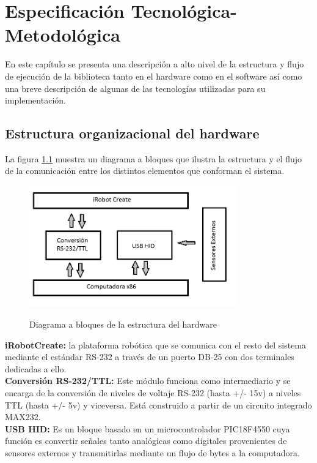 \documentclass[letterpaper,openright,12pt]{book}
\begin{document}
\chapter{Especificación Tecnológica-Metodológica}
En este capítulo se presenta una descripción a alto nivel de la estructura y flujo de ejecución de la biblioteca tanto en el hardware como en el software así como una breve descripción de algunas de las tecnologías utilizadas para su implementación.
\section{Estructura organizacional del hardware}
La figura \ref{fig:bloquesHardware} muestra un diagrama a bloques que ilustra la estructura y el flujo de la comunicación entre los distintos elementos que conforman el sistema.\\
\begin{figure}
\begin{center}
\includegraphics[width=0.8\textwidth]{figures/bloquesHardware.png}
\caption{Diagrama a bloques de la estructura del hardware}
\centering
\label{fig:bloquesHardware}
\end{center}
\end{figure} 
\textbf{iRobotCreate:} la plataforma robótica que se comunica con el resto del sistema mediante el estándar RS-232 a través de un puerto DB-25 con dos terminales dedicadas a ello.\\
\textbf{Conversión RS-232/TTL:} Este módulo funciona como intermediario y se encarga de la conversión de niveles de voltaje RS-232 (hasta +/- 15v) a niveles TTL (hasta +/- 5v) y viceversa. Está construido a partir de un circuito integrado MAX232.\\
\textbf{USB HID:} Es un bloque basado en un microcontrolador PIC18F4550 cuya función es convertir señales tanto analógicas como digitales provenientes de sensores externos y transmitirlas mediante un flujo de bytes a la computadora.\\ 
\end{document}
